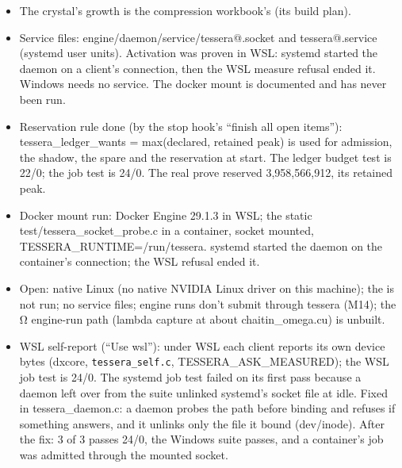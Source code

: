 \begin{enumerate}
\begin{itemize}
\begin{itemize}
\item Fixed: PATH\_\allowbreak{}MAX via linux/limits.h; \_\allowbreak{}GNU\_\allowbreak{}SOURCE in the measure; the timer's return; ENGINE\_\allowbreak{}NOINLINE\_\allowbreak{}HELPER; platform strings guarded; the daemon uses its string table, and the ticket names its signum.
\item WSL's NVML lists no process's memory; tessera\_\allowbreak{}measure\_\allowbreak{}paravirtual refuses, and the daemon exits. The suite passes with 0 warnings.
\item Native Linux is not available here.
\end{itemize}
\item The crystal's growth is the compression workbook's (its build plan).
\item Service files: engine/daemon/service/tessera@.socket and tessera@.service (systemd user units). Activation was proven in WSL: systemd started the daemon on a client's connection, then the WSL measure refusal ended it. Windows needs no service. The docker mount is documented and has never been run.
\item Reservation rule done (by the stop hook's “finish all open items”): tessera\_\allowbreak{}ledger\_\allowbreak{}wants = max(declared, retained peak) is used for admission, the shadow, the spare and the reservation at start. The ledger budget test is 22/0; the job test is 24/0. The real prove reserved 3,958,566,912, its retained peak.
\item Docker mount run: Docker Engine 29.1.3 in WSL; the static test/tessera\_\allowbreak{}socket\_\allowbreak{}probe.c in a container, socket mounted, TESSERA\_\allowbreak{}RUNTIME=/run/tessera. systemd started the daemon on the container's connection; the WSL refusal ended it.
\item Open: native Linux (no native NVIDIA Linux driver on this machine); the is not run; no service files; engine runs don't submit through tessera (M14); the Ω engine-run path (lambda capture at about chaitin\_\allowbreak{}omega.cu) is unbuilt.
\item WSL self-report (“Use wsl”): under WSL each client reports its own device bytes (dxcore, \texttt{tessera\_\allowbreak{}self.\allowbreak{}c}, TESSERA\_\allowbreak{}ASK\_\allowbreak{}MEASURED); the WSL job test is 24/0. The systemd job test failed on its first pass because a daemon left over from the suite unlinked systemd's socket file at idle. Fixed in tessera\_\allowbreak{}daemon.c: a daemon probes the path before binding and refuses if something answers, and it unlinks only the file it bound (dev/inode). After the fix: 3 of 3 passes 24/0, the Windows suite passes, and a container's job was admitted through the mounted socket.

\end{itemize}
\end{enumerate}
